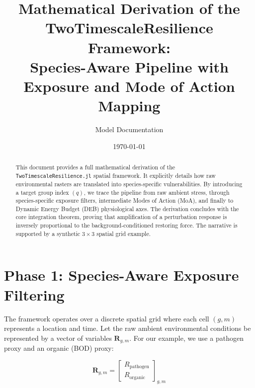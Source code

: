 \documentclass[11pt,a4paper]{article}
\title{Mathematical Derivation of the TwoTimescaleResilience Framework:\\
Species-Aware Pipeline with Exposure and Mode of Action Mapping}
\author{Model Documentation}
\date{\today}
\begin{document}
\maketitle

\begin{abstract}
This document provides a full mathematical derivation of the \texttt{TwoTimescaleResilience.jl} spatial framework. It explicitly details how raw environmental rasters are translated into species-specific vulnerabilities. By introducing a target group index $(q)$, we trace the pipeline from raw ambient stress, through species-specific exposure filters, intermediate Modes of Action (MoA), and finally to Dynamic Energy Budget (DEB) physiological axes. The derivation concludes with the core integration theorem, proving that amplification of a perturbation response is inversely proportional to the background-conditioned restoring force. The narrative is supported by a synthetic $3\times3$ spatial grid example.
\end{abstract}

\section{Phase 1: Species-Aware Exposure Filtering}

The framework operates over a discrete spatial grid where each cell $(g,m)$ represents a location and time. Let the raw ambient environmental conditions be represented by a vector of variables $\bm{R}_{g,m}$. For our example, we use a pathogen proxy and an organic (BOD) proxy:

\begin{equation}
\bm{R}_{g,m}=\begin{bmatrix}R_{\mathrm{pathogen}}\\ R_{\mathrm{organic}}\end{bmatrix}_{g,m}
\end{equation}
\end{document}
